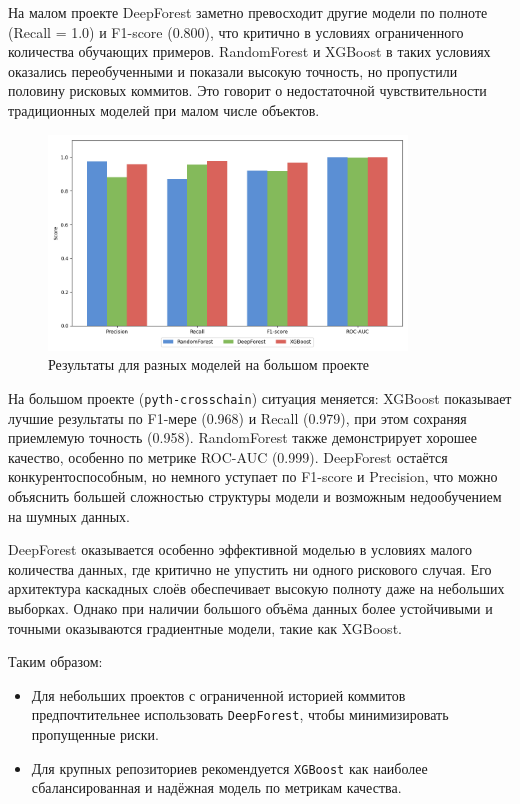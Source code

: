 На малом проекте DeepForest заметно превосходит другие модели по полноте (Recall = 1.0) и F1-score (0.800), что критично в условиях ограниченного количества обучающих примеров. RandomForest и XGBoost в таких условиях оказались переобученными и показали высокую точность, но пропустили половину рисковых коммитов. Это говорит о недостаточной чувствительности традиционных моделей при малом числе объектов.

\begin{figure}[ht]
	\centering
	\includegraphics[width=0.85\textwidth]{my_folder/images/high_model_comparison.png}
	\caption{Результаты для разных моделей на большом проекте}
	\label{tab:model_comparison2}
\end{figure}

На большом проекте (\texttt{pyth-crosschain}) ситуация меняется: XGBoost показывает лучшие результаты по F1-мере (0.968) и Recall (0.979), при этом сохраняя приемлемую точность (0.958). RandomForest также демонстрирует хорошее качество, особенно по метрике ROC-AUC (0.999). DeepForest остаётся конкурентоспособным, но немного уступает по F1-score и Precision, что можно объяснить большей сложностью структуры модели и возможным недообучением на шумных данных.

DeepForest оказывается особенно эффективной моделью в условиях малого количества данных, где критично не упустить ни одного рискового случая. Его архитектура каскадных слоёв обеспечивает высокую полноту даже на небольших выборках. Однако при наличии большого объёма данных более устойчивыми и точными оказываются градиентные модели, такие как XGBoost.

Таким образом:
\begin{itemize}
	\item Для небольших проектов с ограниченной историей коммитов предпочтительнее использовать \texttt{DeepForest}, чтобы минимизировать пропущенные риски.
	\item Для крупных репозиториев рекомендуется \texttt{XGBoost} как наиболее сбалансированная и надёжная модель по метрикам качества.
\end{itemize}

